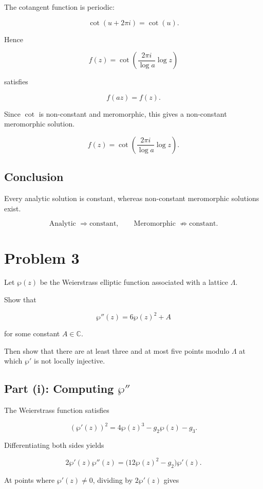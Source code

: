 \documentclass[12pt,a4paper]{article}
\theoremstyle{notespace}
\begin{document}
The cotangent function is periodic:

\[
\cot(u+2\pi i)=\cot(u).
\]

Hence

\[
f(z)
=
\cot\!\left(
\frac{2\pi i}{\log a}\log z
\right)
\]

satisfies

\[
f(az)=f(z).
\]

Since \(\cot\) is non-constant and meromorphic, this gives a non-constant meromorphic solution.

\[
\boxed{
	f(z)
	=
	\cot\!\left(
	\frac{2\pi i}{\log a}\log z
	\right).
}
\]

\subsection{Conclusion}

Every analytic solution is constant, whereas non-constant meromorphic solutions exist.

\[
\boxed{
	\text{Analytic } \Rightarrow \text{constant},
	\qquad
	\text{Meromorphic } \not\Rightarrow \text{constant}.
}
\]

\newpage

\section{Problem 3}

Let \(\wp(z)\) be the Weierstrass elliptic function associated with a lattice \(\Lambda\).

Show that

\[
\wp''(z)=6\wp(z)^2+A
\]

for some constant \(A\in\mathbb C\).

Then show that there are at least three and at most five points modulo \(\Lambda\) at which \(\wp'\) is not locally injective.

\subsection{Part (i): Computing \(\wp''\)}

The Weierstrass function satisfies

\[
(\wp'(z))^2
=
4\wp(z)^3-g_2\wp(z)-g_3.
\]

Differentiating both sides yields

\[
2\wp'(z)\wp''(z)
=
\bigl(12\wp(z)^2-g_2\bigr)\wp'(z).
\]

At points where \(\wp'(z)\neq 0\), dividing by \(2\wp'(z)\) gives
\end{document}
